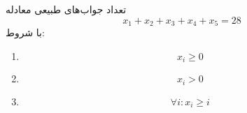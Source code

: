 \EXERCISE
تعداد جواب‌های طبیعی معادله
$$x_1 + x_2 + x_3 + x_4 + x_5 = 28$$
با شروط:
\begin{enumerate}
\item
$$x_i \geq 0$$
\item
$$x_i > 0$$
\item
$$\forall i: x_i \geq i$$
\end{enumerate}